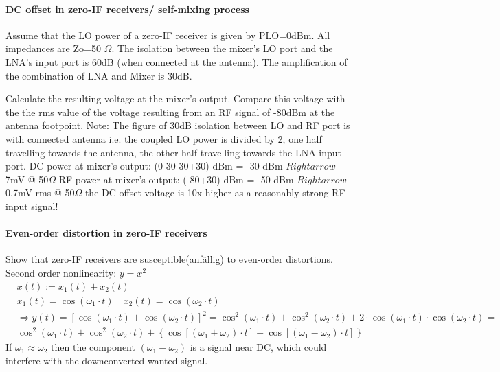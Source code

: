 \paragraph{DC offset in zero-IF receivers/ self-mixing process}
Assume that the LO power of a zero-IF receiver is given by PLO=0dBm. All impedances are Zo=50
$\Omega$. The isolation between the mixer's LO port and the LNA's input port is 60dB (when connected
at the antenna). The amplification of the combination of LNA and Mixer is 30dB.

Calculate the resulting voltage at the mixer's output. Compare this voltage with the the rms value
of the voltage resulting from an RF signal of -80dBm at the antenna footpoint.\newline\newline
Note: The figure of 30dB isolation between LO and RF port is with connected antenna i.e. the
coupled LO power is divided by 2, one half travelling towards the antenna, the other half travelling
towards the LNA input port.\newline
DC power at mixer's output: (0-30-30+30) dBm = -30 dBm $Rightarrow$ 7mV @ 50$\Omega$
RF power at mixer's output: (-80+30) dBm = -50 dBm $Rightarrow$ 0.7mV rms @ 50$\Omega$\newline
the DC offset voltage is 10x higher as a reasonably strong RF input signal!
\paragraph{Even-order distortion in zero-IF receivers}
Show that zero-IF receivers are susceptible(anfällig) to even-order distortions.\newline\newline
Second order nonlinearity: $y=x^2$\newline
$$
\begin{aligned}
& x(t):=x_1(t)+x_2(t) \\
& x_1(t)=\cos \left(\omega_1 \cdot t\right) \quad x_2(t)=\cos \left(\omega_2 \cdot t\right) \\
& \Rightarrow y(t)=\left[\cos \left(\omega_1 \cdot t\right)+\cos \left(\omega_2 \cdot t\right)\right]^2=\cos ^2\left(\omega_1 \cdot t\right)+\cos ^2\left(\omega_2 \cdot t\right)+2 \cdot \cos \left(\omega_1 \cdot t\right) \cdot \cos \left(\omega_2 \cdot t\right)= \\
& \cos ^2\left(\omega_1 \cdot t\right)+\cos ^2\left(\omega_2 \cdot t\right)+\left\{\cos \left[\left(\omega_1+\omega_2\right) \cdot t\right]+\cos \left[\left(\omega_1-\omega_2\right) \cdot t\right]\right\}
\end{aligned}
$$
If $\omega_1 \approx \omega_2$ then the component $\left(\omega_1-\omega_2\right)$ is a signal near DC, which could interfere with the downconverted wanted signal.
